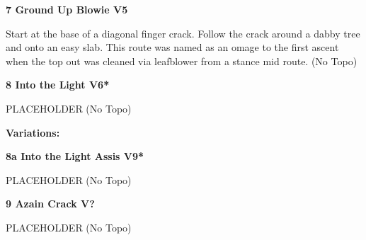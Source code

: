 \begin{multicols}{2}
\label{pt:Ground up Blowie}
					\begin{minipage}{\linewidth}	
					\label{rt:Ground Up Blowie}
\colorbox{RoyalBlue!20}{
\parbox{0.95\textwidth}{
\textbf{
7 Ground Up Blowie V5    
}
}
}

					\begin{adjustwidth}{0.5cm}{}				
					Start at the base of a diagonal finger crack. Follow the crack around a dabby tree and onto an easy slab. This route was named as an omage to the first ascent when the top out was cleaned via leafblower from a stance mid route.
						\newline (No Topo) 
					\end{adjustwidth}
					\end{minipage}
					\begin{minipage}{\linewidth}	
					\label{rt:Into the Light}
\colorbox{RoyalBlue!20}{
\parbox{0.95\textwidth}{
\textbf{
8 Into the Light V6*  
}
}
}

					\begin{adjustwidth}{0.5cm}{}				
					PLACEHOLDER
						\newline (No Topo) 
					\end{adjustwidth}
					\end{minipage}
						\begin{adjustwidth}{0.5cm}{}				
						\textbf{Variations:} \newline
							\begin{minipage}{\linewidth}	
							\label{vr:Into the Light Assis}
\colorbox{Goldenrod!50}{
\parbox{0.95\textwidth}{
\textbf{
8a Into the Light Assis V9*  
}
}
}

							\begin{adjustwidth}{0.5cm}{}				
							PLACEHOLDER
								\newline (No Topo) 
							\end{adjustwidth}
							\end{minipage}
						\end{adjustwidth}
					\begin{minipage}{\linewidth}	
					\label{rt:Azain Crack}
\colorbox{black!20}{
\parbox{0.95\textwidth}{
\textbf{
9 Azain Crack V?  
}
}
}

					\begin{adjustwidth}{0.5cm}{}				
					PLACEHOLDER
						\newline (No Topo) 
					\end{adjustwidth}
					\end{minipage}

\end{multicols}
